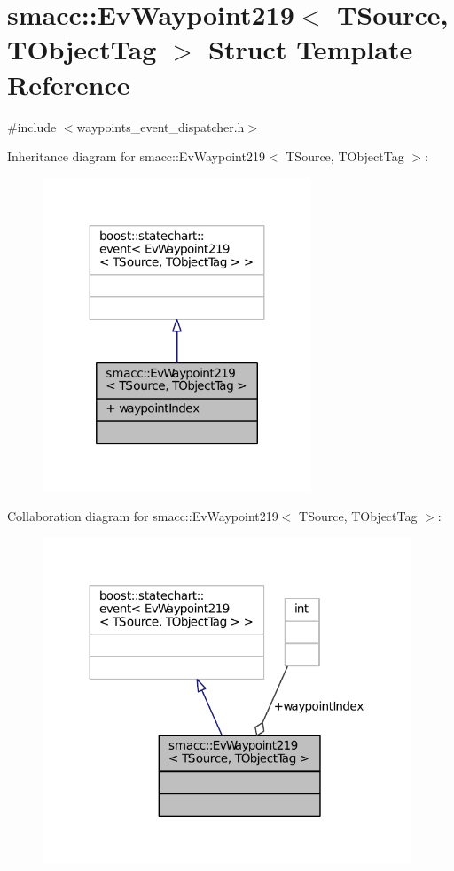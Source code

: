 \hypertarget{structsmacc_1_1EvWaypoint219}{}\section{smacc\+:\+:Ev\+Waypoint219$<$ T\+Source, T\+Object\+Tag $>$ Struct Template Reference}
\label{structsmacc_1_1EvWaypoint219}


{\ttfamily \#include $<$waypoints\+\_\+event\+\_\+dispatcher.\+h$>$}



Inheritance diagram for smacc\+:\+:Ev\+Waypoint219$<$ T\+Source, T\+Object\+Tag $>$\+:
\nopagebreak
\begin{figure}[H]
\begin{center}
\leavevmode
\includegraphics[width=227pt]{structsmacc_1_1EvWaypoint219__inherit__graph}
\end{center}
\end{figure}


Collaboration diagram for smacc\+:\+:Ev\+Waypoint219$<$ T\+Source, T\+Object\+Tag $>$\+:
\nopagebreak
\begin{figure}[H]
\begin{center}
\leavevmode
\includegraphics[width=312pt]{structsmacc_1_1EvWaypoint219__coll__graph}
\end{center}
\end{figure}
